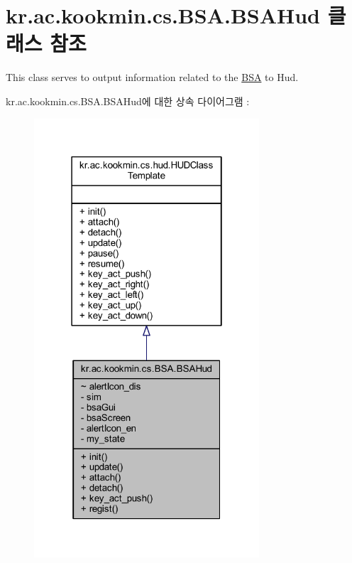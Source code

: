 \hypertarget{classkr_1_1ac_1_1kookmin_1_1cs_1_1_b_s_a_1_1_b_s_a_hud}{}\section{kr.\+ac.\+kookmin.\+cs.\+B\+S\+A.\+B\+S\+A\+Hud 클래스 참조}
\label{classkr_1_1ac_1_1kookmin_1_1cs_1_1_b_s_a_1_1_b_s_a_hud}


This class serves to output information related to the \hyperlink{namespacekr_1_1ac_1_1kookmin_1_1cs_1_1_b_s_a}{B\+S\+A} to Hud.  




kr.\+ac.\+kookmin.\+cs.\+B\+S\+A.\+B\+S\+A\+Hud에 대한 상속 다이어그램 \+: \nopagebreak
\begin{figure}[H]
\begin{center}
\leavevmode
\includegraphics[width=238pt]{classkr_1_1ac_1_1kookmin_1_1cs_1_1_b_s_a_1_1_b_s_a_hud__inherit__graph}
\end{center}
\end{figure}


